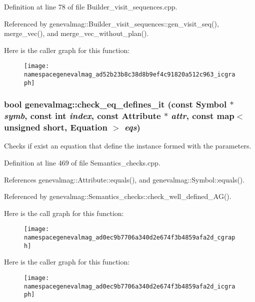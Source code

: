 Definition at line 78 of file Builder\_\-visit\_\-sequences.cpp.



Referenced by genevalmag::Builder\_\-visit\_\-sequences::gen\_\-visit\_\-seq(), merge\_\-vec(), and merge\_\-vec\_\-without\_\-plan().



Here is the caller graph for this function:\nopagebreak
\begin{figure}[H]
\begin{center}
\leavevmode
\texttt{[image: namespacegenevalmag\_ad52b23b8c38d8b9ef4c91820a512c963\_icgraph]}
\end{center}
\end{figure}


\hypertarget{namespacegenevalmag_ad0ec9b7706a340d2e674f3b4859afa2d}{
\subsubsection[{check\_\-eq\_\-defines\_\-it}]{\setlength{\rightskip}{0pt plus 5cm}bool genevalmag::check\_\-eq\_\-defines\_\-it (const Symbol $\ast$ {\em symb}, \/  const int {\em index}, \/  const Attribute $\ast$ {\em attr}, \/  const map$<$ unsigned short, Equation $>$ {\em eqs})}}
\label{namespacegenevalmag_ad0ec9b7706a340d2e674f3b4859afa2d}
Checks if exist an equation that define the instance formed with the parameters. 

Definition at line 469 of file Semantics\_\-checks.cpp.



References genevalmag::Attribute::equals(), and genevalmag::Symbol::equals().



Referenced by genevalmag::Semantics\_\-checks::check\_\-well\_\-defined\_\-AG().



Here is the call graph for this function:\nopagebreak
\begin{figure}[H]
\begin{center}
\leavevmode
\texttt{[image: namespacegenevalmag\_ad0ec9b7706a340d2e674f3b4859afa2d\_cgraph]}
\end{center}
\end{figure}




Here is the caller graph for this function:\nopagebreak
\begin{figure}[H]
\begin{center}
\leavevmode
\texttt{[image: namespacegenevalmag\_ad0ec9b7706a340d2e674f3b4859afa2d\_icgraph]}
\end{center}
\end{figure}


